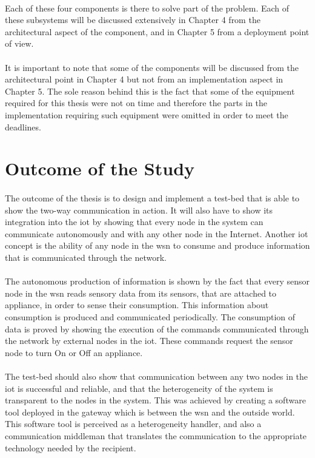 \documentclass[oneside,12pt,a4paper,final]{book}
\begin{document}
\paragraph{}
Each of these four components is there to solve part of the problem. Each of these subsystems will be discussed extensively in Chapter 4 from the architectural aspect of the component, and in Chapter 5 from a deployment point of view. 
\paragraph{}
It is important to note that some of the components will be discussed from the architectural point in Chapter 4 but not from an implementation aspect in Chapter 5. The sole reason behind this is the fact that some of the equipment required for this thesis were not on time and therefore the parts in the implementation requiring such equipment were omitted in order to meet the deadlines.
\section{Outcome of the Study}
\paragraph{}
The outcome of the thesis is to design and implement a test-bed that is able to show the two-way communication in action. It will also have to show its integration into the \gls{iot} by showing that every node in the system can communicate autonomously and with any other node in the Internet. Another \gls{iot} concept is the ability of any node in the \gls{wsn} to consume and produce information that is communicated through the network.
\paragraph{}
The autonomous production of information is shown by the fact that every sensor node in the \gls{wsn} reads sensory data from its sensors, that are attached to appliance, in order to sense their consumption. This information about consumption is produced and communicated periodically. The consumption of data is proved by showing the execution of the commands communicated through the network by external nodes in the \gls{iot}. These commands request the sensor node to turn On or Off an appliance.
\paragraph{}
The test-bed should also show that communication between any two nodes in the \gls{iot} is successful and reliable, and that the heterogeneity of the system is transparent to the nodes in the system. This was achieved by creating a software tool deployed in the gateway which is between the \gls{wsn} and the outside world. This software tool is perceived as a heterogeneity handler, and also a communication middleman that translates the communication to the appropriate technology needed by the recipient.
\end{document}
